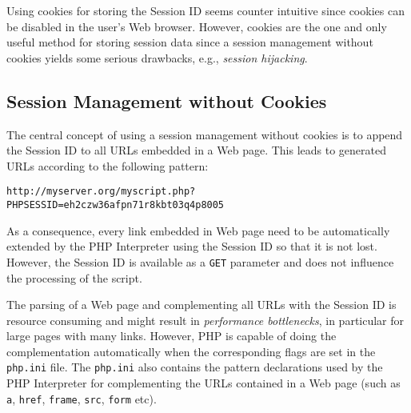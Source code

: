 \documentclass[a4paper, justified, notoc]{tufte-handout} %
\begin{document}
Using cookies for storing the Session ID seems counter intuitive since cookies can be disabled in the user's Web browser. However, cookies are the one and only useful method for storing session data since a session management without cookies yields some serious drawbacks, e.g., \emph{session hijacking}.


\subsection{Session Management without Cookies} %
\label{sub:session_without_cookies}
The central concept of using a session management without cookies is to append the Session ID to all URLs embedded in a Web page. This leads to generated URLs according to the following pattern:
\begin{Verbatim}
http://myserver.org/myscript.php?PHPSESSID=eh2czw36afpn71r8kbt03q4p8005
\end{Verbatim}  
As a consequence, every link embedded in Web page need to be automatically extended by the PHP Interpreter using the Session ID so that it is not lost. %
However, the Session ID is available as a \texttt{GET} parameter and does not influence the processing of the script.

The parsing of a Web page and complementing all URLs with the Session ID is resource consuming and might result in \emph{performance bottlenecks}, in particular for large pages with many links.
However, PHP is capable of doing the complementation automatically when the corresponding flags are set in the \texttt{php.ini} file. The \texttt{php.ini} also contains the pattern declarations used by the PHP Interpreter for complementing the URLs contained in a Web page (such as \texttt{a}, \texttt{href}, \texttt{frame}, \texttt{src}, \texttt{form} etc).
\end{document}
